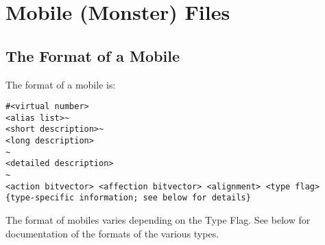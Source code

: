 \documentclass[11pt]{article}
\begin{document}
\section{Mobile (Monster) Files}
\subsection{The Format of a Mobile}
The format of a mobile is:
\begin{verbatim}
#<virtual number>
<alias list>~
<short description>~
<long description>
~
<detailed description>
~
<action bitvector> <affection bitvector> <alignment> <type flag>
{type-specific information; see below for details}
\end{verbatim}
The format of mobiles varies depending on the Type Flag.  See below for documentation of the formats of the various types.
\end{document}
